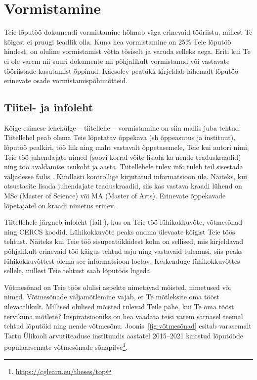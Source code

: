 \section{Vormistamine}  \label{vormistamine}
Teie lõputöö dokumendi vormistamine hõlmab väga erinevaid tööriistu, millest Te kõigest ei pruugi teadlik olla. Kuna hea vormistamine on 25\% Teie lõputöö hindest, on oluline vormistamist võtta tõsiselt ja varuda selleks aega. Eriti kui Te ei ole varem nii suuri dokumente nii põhjalikult vormistanud või vastavate tööriistade kasutamist õppinud. Käesolev peatükk kirjeldab lähemalt lõputöö erinevate osade vormistamispõhimõtteid.

\subsection{Tiitel- ja infoleht}
Kõige esimese lehekülge – tiitellehe – vormistamine on siin mallis juba tehtud. Tiitellehel peab olema Teie lõpetatav õppekava (sh õppeasutus ja instituut), lõputöö pealkiri, töö liik ning maht vastavalt õppetasemele, Teie kui autori nimi, Teie töö juhendajate nimed (soovi korral võite lisada ka nende teaduskraadid) ning töö avaldamise asukoht ja aasta. Tiitellehele tulev info tuleb teil sisestada väljadesse failis . Kindlasti kontrollige kirjutatud informatsioon üle. Näiteks, kui otsustasite lisada juhendajate teaduskraadid, siis kas vastava kraadi lühend on MSc (Master of Science) või MA (Master of Arts). Erinevate õppekavade lõpetajatel on kraadi nimetus erinev.

Tiitellehele järgneb infoleht (fail ), kus on Teie töö lühikokkuvõte, võtmesõnad ning CERCS koodid. Lühikokkuvõte peaks andma ülevaate kõigist Teie töös tehtust. Näiteks kui Teie töö sisupeatükkidest kolm on sellised, mis kirjeldavad põhjalikult erinevaid töö käigus tehtud asju ning vastavaid tulemusi, siis peaks lühikokkuvõttest olema see informatsioon loetav. Keskenduge lühikokkuvõttes sellele, millest Teie tehtust saab lõputöös lugeda.

Võtmesõnad on Teie töös olulisi aspekte nimetavad mõisted, nimetused või nimed. Võtmesõnade väljamõtlemine vajab, et Te mõtleksite oma tööst ülevaatlikult. Millised olulised mõisted tulevad Teile pähe, kui Te oma tööst tervikuna mõtlete? Inspiratsiooniks on hea vaadata teisi varem sarnasel teemal tehtud lõputöid ning nende võtmesõnu. Joonis~\ref{fig:võtmesõnad} esitab varasemalt Tartu Ülikooli arvutiteaduse instituudis aastatel 2015–2021 kaitstud lõputööde populaarsemate võtmesõnade sõnapilve\footnote{\url{https://cglearn.eu/theses/top}}.

